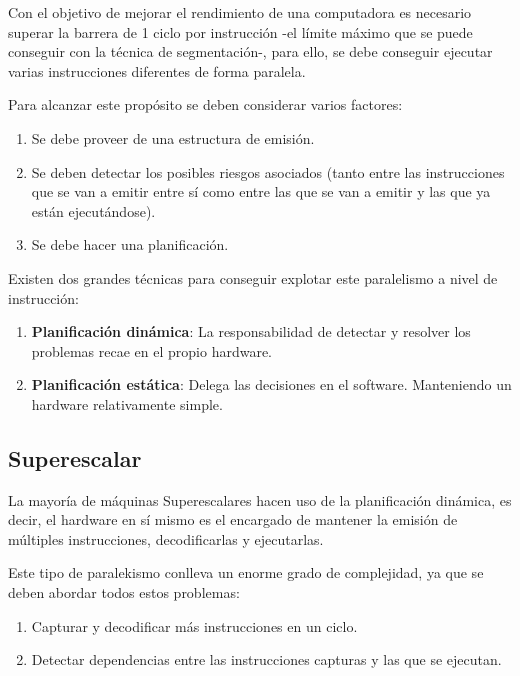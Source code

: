 Con el objetivo de mejorar el rendimiento de una computadora es necesario superar la barrera
de 1 ciclo por instrucción -el límite máximo que se puede conseguir con la técnica de segmentación-,
para ello, se debe conseguir ejecutar varias instrucciones diferentes de forma paralela.

\bigskip
Para alcanzar este propósito se deben considerar varios factores:

\begin{enumerate}

\item Se debe proveer de una estructura de emisión.

\item Se deben detectar los posibles riesgos asociados (tanto entre las instrucciones que se van a 
emitir entre sí como entre las que se van a emitir y las que ya están ejecutándose). 

\item Se debe hacer una planificación.

\end{enumerate}

\bigskip
Existen dos grandes técnicas para conseguir explotar este paralelismo a nivel de instrucción:

\begin{enumerate}

\item \textbf{Planificación dinámica}: La responsabilidad de detectar y resolver los problemas recae
en el propio hardware.

\item \textbf{Planificación estática}: Delega las decisiones en el software. Manteniendo un hardware
relativamente simple.

\end{enumerate}

\subsection{Superescalar}

La mayoría de máquinas Superescalares hacen uso de la planificación dinámica, es decir, el hardware 
en sí mismo es el encargado de mantener la emisión de múltiples instrucciones, decodificarlas y 
ejecutarlas.

\bigskip
Este tipo de paralekismo conlleva un enorme grado de complejidad, ya que se deben abordar 
todos estos problemas:

\begin{enumerate}

\item Capturar y decodificar más instrucciones en un ciclo.

\item Detectar dependencias entre las instrucciones capturas y las que se ejecutan.

\end{enumerate}

